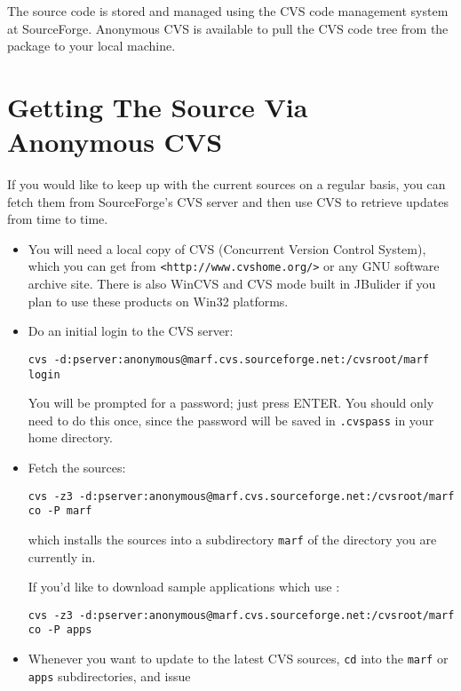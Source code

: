 The {\marf} source code is stored and managed using the
CVS code management system at SourceForge.
Anonymous CVS
is available to pull the CVS code tree from the
{\marf} package to your local machine.

\section{Getting The Source Via Anonymous CVS}

If you would like to keep up with the current sources on a regular
basis, you can fetch them from SourceForge's CVS server
and then use CVS to
retrieve updates from time to time.

\begin{itemize}
\item
     You will need a local copy of CVS
     (Concurrent Version Control System), which you can get from
     \verb+<http://www.cvshome.org/>+ or
     any GNU software archive site. There is also WinCVS and
     CVS mode built in JBulider if you plan to use these products
     on Win32 platforms.

\item
     Do an initial login to the CVS server:

\begin{verbatim}
cvs -d:pserver:anonymous@marf.cvs.sourceforge.net:/cvsroot/marf login
\end{verbatim}

     You will be prompted for a password; just press ENTER.
     You should only need to do this once, since the password will be
     saved in \verb+.cvspass+ in your home directory.

\item
     Fetch the {\marf} sources:

\begin{verbatim}
cvs -z3 -d:pserver:anonymous@marf.cvs.sourceforge.net:/cvsroot/marf co -P marf
\end{verbatim}

     which installs the {\marf} sources into a
     subdirectory \verb+marf+
     of the directory you are currently in.

     If you'd like to download sample applications which use {\marf}:

\begin{verbatim}
cvs -z3 -d:pserver:anonymous@marf.cvs.sourceforge.net:/cvsroot/marf co -P apps
\end{verbatim}


\item
     Whenever you want to update to the latest CVS sources,
     \verb+cd+ into
     the \verb+marf+ or \verb+apps+ subdirectories, and issue


\end{itemize}
